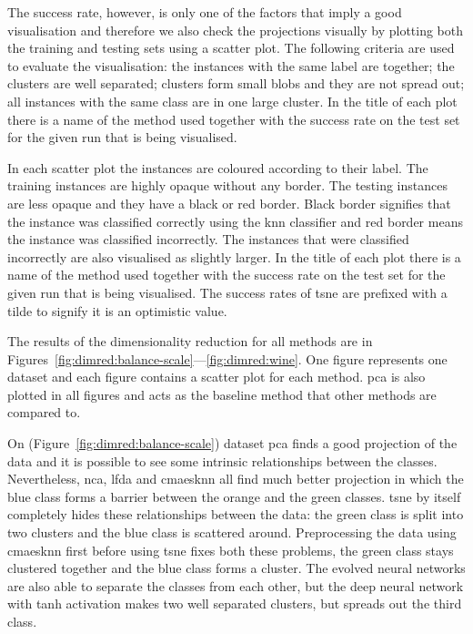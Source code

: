 

The success rate, however, is only one of the factors that imply a good visualisation and therefore we also check the projections visually by plotting both the training and testing sets using a scatter plot. The following criteria are used to evaluate the visualisation: the instances with the same label are together; the clusters are well separated; clusters form small blobs and they are not spread out; all instances with the same class are in one large cluster. In the title of each plot there is a name of the method used together with the success rate on the test set for the given run that is being visualised.

In each scatter plot the instances are coloured according to their label. The training instances are highly opaque without any border. The testing instances are less opaque and they have a black or red border. Black border signifies that the instance was classified correctly using the \ac{knn} classifier and red border means the instance was classified incorrectly. The instances that were classified incorrectly are also visualised as slightly larger. In the title of each plot there is a name of the method used together with the success rate on the test set for the given run that is being visualised. The success rates of \ac{tsne} are prefixed with a tilde to signify it is an optimistic value.

The results of the dimensionality reduction for all methods are in Figures~\ref{fig:dimred:balance-scale}---\ref{fig:dimred:wine}. One figure represents one dataset and each figure contains a scatter plot for each method. \ac{pca} is also plotted in all figures and acts as the baseline method that other methods are compared to. 

On  (Figure~\ref{fig:dimred:balance-scale}) dataset \ac{pca} finds a good projection of the data and it is possible to see some intrinsic relationships between the classes. Nevertheless, \ac{nca}, \ac{lfda} and \ac{cmaesknn} all find much better projection in which the blue class forms a barrier between the orange and the green classes. \ac{tsne} by itself completely hides these relationships between the data: the green class is split into two clusters and the blue class is scattered around. Preprocessing the data using \ac{cmaesknn} first before using \ac{tsne} fixes both these problems, the green class stays clustered together and the blue class forms a cluster. The evolved neural networks are also able to separate the classes from each other, but the deep neural network with \ac{tanh} activation makes two well separated clusters, but spreads out the third class.

